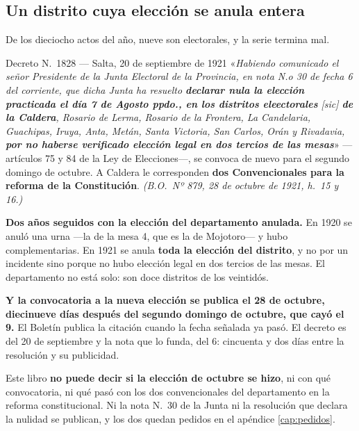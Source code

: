 \subsection*{Un distrito cuya elección se anula entera}

De los dieciocho actos del año, nueve son electorales, y la serie termina mal.

\begin{ficha}{Decreto N.\ 1828 --- Salta, 20 de septiembre de 1921}
«\textit{Habiendo comunicado el señor Presidente de la Junta Electoral de la Provincia, en nota
N.o 30 de fecha 6 del corriente, que dicha Junta ha resuelto \textbf{declarar nula la elección
practicada el día 7 de Agosto ppdo., en los distritos eleectorales} \textit{[sic]} \textbf{de la
Caldera}, Rosario de Lerma, Rosario de la Frontera, La Candelaria, Guachipas, Iruya, Anta, Metán,
Santa Victoria, San Carlos, Orán y Rivadavia, \textbf{por no haberse verificado elección legal en
dos tercios de las mesas}}» ---artículos 75 y 84 de la Ley de Elecciones---, se convoca de nuevo
para el segundo domingo de octubre. A Caldera le corresponden \textbf{dos Convencionales para la
reforma de la Constitución}.
\textit{(B.O.\ Nº 879, 28 de octubre de 1921, h.\ 15 y 16.)}
\end{ficha}

\begin{cautela}
\textbf{Dos años seguidos con la elección del departamento anulada.} En 1920 se anuló una urna
---la de la mesa 4, que es la de Mojotoro--- y hubo complementarias. En 1921 se anula
\textbf{toda la elección del distrito}, y no por un incidente sino porque no hubo elección legal
en dos tercios de las mesas. El departamento no está solo: son doce distritos de los veintidós.

\textbf{Y la convocatoria a la nueva elección se publica el 28 de octubre, diecinueve días después
del segundo domingo de octubre, que cayó el 9.} El Boletín publica la citación cuando la fecha
señalada ya pasó. El decreto es del 20 de septiembre y la nota que lo funda, del 6: cincuenta y
dos días entre la resolución y su publicidad.

Este libro \textbf{no puede decir si la elección de octubre se hizo}, ni con qué convocatoria, ni
qué pasó con los dos convencionales del departamento en la reforma constitucional. Ni la nota N.\
30 de la Junta ni la resolución que declara la nulidad se publican, y los dos quedan pedidos en
el apéndice \ref{cap:pedidos}.
\end{cautela}

